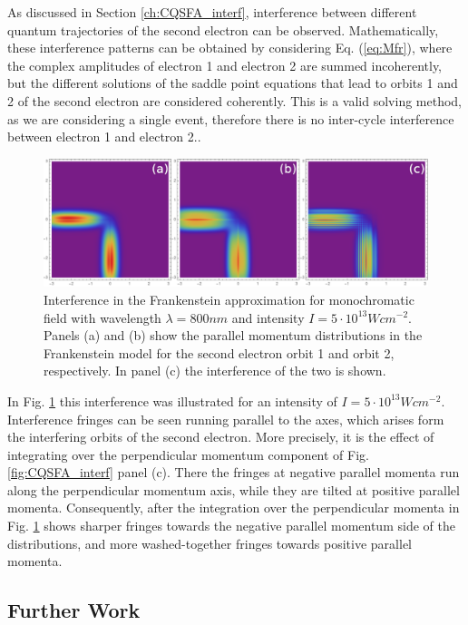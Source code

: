 \documentclass[11pt]{article}
\numberwithin{equation}{section}
\begin{document}
As discussed in Section \ref{ch:CQSFA_interf}, interference between different quantum trajectories of the second electron can be observed. Mathematically, these interference patterns can be obtained by considering Eq. (\ref{eq:Mfr}), where the complex amplitudes of electron 1 and electron 2 are summed incoherently, but the different solutions of the saddle point equations that lead to orbits 1 and 2 of the second electron are considered coherently. This is a valid solving method, as we are considering a single event, therefore there is no inter-cycle interference between electron 1 and electron 2..
\begin{figure}[!htb]
    \centering
    \includegraphics[width=14cm]{Figures/Frank_800_5e13_3up_orb12_interf.png}
    \caption{Interference in the Frankenstein approximation for monochromatic field with wavelength $\lambda = 800nm$ and intensity $I=5\cdot10^{13}Wcm^{-2}$. Panels (a) and (b) show the parallel momentum distributions in the Frankenstein model for the second electron orbit 1 and orbit 2, respectively. In panel (c) the interference of the two is shown.}
    \label{fig:frank_inter}
\end{figure}
\newline
In Fig. \ref{fig:frank_inter} this interference was illustrated for an intensity of $I=5\cdot10^{13}Wcm^{-2}$. Interference fringes can be seen running parallel to the axes, which arises form the interfering orbits of the second electron. More precisely, it is the effect of integrating over the perpendicular momentum component of Fig. \ref{fig:CQSFA_interf} panel (c). There the fringes at negative parallel momenta run along the perpendicular momentum axis, while they are tilted at positive parallel momenta. Consequently, after the integration over the perpendicular momenta in Fig. \ref{fig:frank_inter} shows sharper fringes towards the negative parallel momentum side of the distributions, and more washed-together fringes towards positive parallel momenta. 

\subsection{Further Work}
\end{document}
